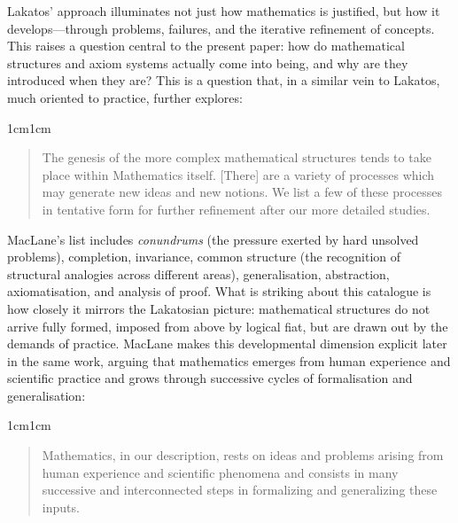 \documentclass[11pt,a4paper]{article}
\begin{document}
Lakatos' approach illuminates not just how mathematics is justified, but how it develops---through problems, failures, and the iterative refinement of concepts. This raises a question central to the present paper: how do mathematical structures and axiom systems actually come into being, and why are they introduced when they are? This is a question that, in a similar vein to Lakatos, much oriented to practice, \textcite[36]{maclane1986mathematics} further explores:

\begin{adjustwidth}{1cm}{1cm}
\small
\begin{quote}
The genesis of the more complex mathematical structures tends to take place within Mathematics itself. [There] are a variety of processes which may generate new ideas and new notions. We list a few of these processes in tentative form for further refinement after our more detailed studies. \parencite[p. 36]{maclane1986mathematics}
\end{quote}
\end{adjustwidth}

MacLane's list includes \textit{conundrums} (the pressure exerted by hard unsolved problems), completion, invariance, common structure (the recognition of structural analogies across different areas), generalisation, abstraction, axiomatisation, and analysis of proof. What is striking about this catalogue is how closely it mirrors the Lakatosian picture: mathematical structures do not arrive fully formed, imposed from above by logical fiat, but are drawn out by the demands of practice. MacLane makes this developmental dimension explicit later in the same work, arguing that mathematics emerges from human experience and scientific practice and grows through successive cycles of formalisation and generalisation:

\begin{adjustwidth}{1cm}{1cm}
\small
\begin{quote}
Mathematics, in our description, rests on ideas and problems arising from human experience and scientific phenomena and consists in many successive and interconnected steps in formalizing and generalizing these inputs. \parencite[449]{maclane1986mathematics}
\end{quote}
\end{adjustwidth}
\end{document}
